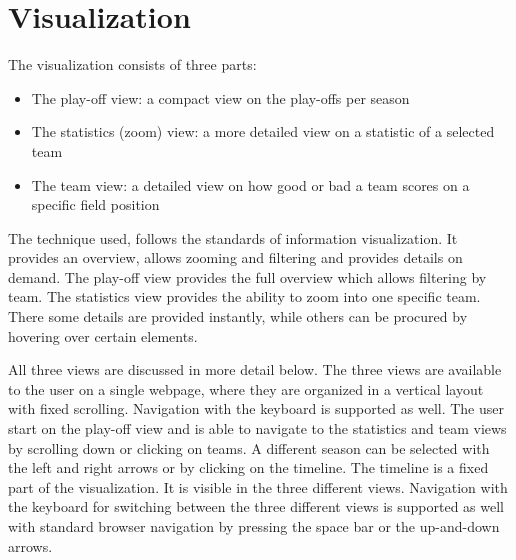 \documentclass[]{sigchi}
\begin{document}



\section{Visualization}\label{sec:visualization}
The visualization consists of three parts:
\begin{itemize}
    \item The play-off view: a compact view on the play-offs per season
    \item The statistics (zoom) view: a more detailed view on a statistic of a
        selected team
    \item The team view: a detailed view on how good or bad a team scores on a
        specific field position
\end{itemize}

The technique used, follows the standards of information visualization. It provides
an overview, allows zooming and filtering and provides details on
demand\cite{mantra,multipleviews,automatingdesign}. The play-off view provides
the full overview which allows filtering by team. The statistics view provides
the ability to zoom into one specific team. There some details are provided
instantly, while others can be procured by hovering over certain elements.

All three views are discussed in more detail below. The three views are
available to the user on a single webpage, where they are organized in a 
vertical layout with fixed scrolling. Navigation with the keyboard is 
supported as well. The user start on the play-off view and is able to 
navigate to the statistics and team views by scrolling down or clicking 
on teams. A different season can be selected with the left and right
arrows or by clicking on the timeline. The timeline is a fixed part of the
visualization. It is visible in the three different views. Navigation 
with the keyboard for switching between the three different views is 
supported as well with standard browser navigation by pressing the space bar or
the up-and-down arrows.
\end{document}
